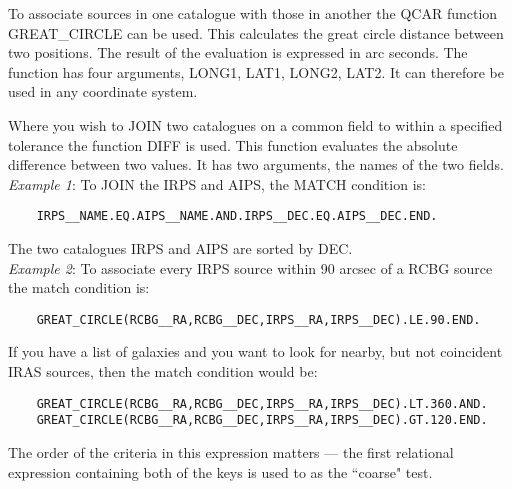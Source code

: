 \begin{description}
\begin{itemize}
To associate sources in one catalogue with those in another the QCAR function 
GREAT\_CIRCLE can be used. 
This calculates the great circle distance between two positions.   
The result of the evaluation is expressed in arc seconds.   
The function has four arguments, LONG1, LAT1, LONG2, LAT2.  
It can therefore be used in any coordinate system.

Where you wish to JOIN two catalogues on a common field to within a specified
tolerance the function DIFF is used. 
This function evaluates the absolute difference between two values.
It has two arguments, the names of the two fields.\\
{\em Example 1}: To JOIN the IRPS and AIPS, the MATCH condition is:
\begin{verbatim}
    IRPS__NAME.EQ.AIPS__NAME.AND.IRPS__DEC.EQ.AIPS__DEC.END.
\end{verbatim}
  The two catalogues IRPS and  AIPS  are  sorted  by  DEC.\\
{\em Example 2}: To associate every IRPS source within 90 arcsec of a RCBG 
source the match condition is:
\begin{verbatim} 
    GREAT_CIRCLE(RCBG__RA,RCBG__DEC,IRPS__RA,IRPS__DEC).LE.90.END.
\end{verbatim}
If you have a list of galaxies and you want to look for nearby, but
not coincident IRAS sources, then the match condition would be:
\begin{verbatim}
    GREAT_CIRCLE(RCBG__RA,RCBG__DEC,IRPS__RA,IRPS__DEC).LT.360.AND.
    GREAT_CIRCLE(RCBG__RA,RCBG__DEC,IRPS__RA,IRPS__DEC).GT.120.END.
\end{verbatim}
The order of the criteria in this expression matters --- the first
relational expression containing both of the keys is used to as the
``coarse" test.


\end{itemize}
\end{description}
